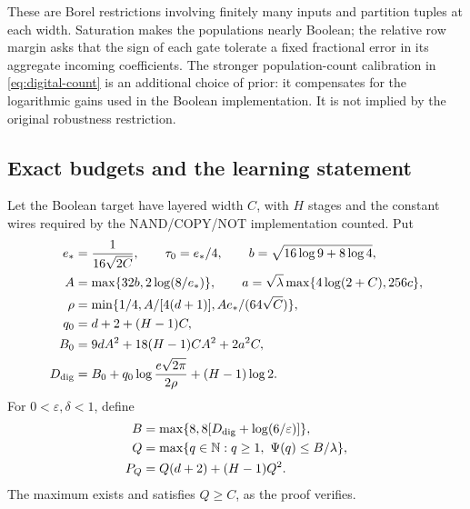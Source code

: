 These are Borel restrictions involving finitely many inputs and partition
tuples at each width.  Saturation makes the populations nearly Boolean;
the relative row margin asks that the sign of each gate tolerate a fixed
fractional error in its aggregate incoming coefficients.  The stronger
population-count calibration in \eqref{eq:digital-count} is an additional
choice of prior: it compensates for the logarithmic gains used in the
Boolean implementation.  It is not implied by the original robustness
restriction.

\subsection{Exact budgets and the learning statement}

Let the Boolean target have layered width $C$, with $H$ stages and the
constant wires required by the NAND/COPY/NOT implementation counted.
Put
\begin{align}
 e_*&=\frac1{16\sqrt{2C}},\qquad \tau_0=e_*/4,\qquad
 b=\sqrt{16\log9+8\log4},\notag\\
 A&=\max\{32b,2\log(8/e_*)\},\qquad
 a=\sqrt\lambda\max\{4\log(2+C),256c\},\notag\\
 \rho&=\min\{1/4,A/[4(d+1)],Ae_*/(64\sqrt C)\},\notag\\
 q_0&=d+2+(H-1)C,\notag\\
 B_0&=9dA^2+18(H-1)CA^2+2a^2C,\notag\\
 D_{\rm dig}&=B_0+q_0\log\frac{e\sqrt{2\pi}}{2\rho}+(H-1)\log2.
 \label{eq:digital-target-budget}
\end{align}
For $0<\varepsilon,\delta<1$, define
\begin{equation}\label{eq:digital-stat-budget}
 \begin{aligned}
 B&=\max\{8,8[D_{\rm dig}+\log(6/\varepsilon)]\},\\
 Q&=\max\{q\in\mathbb N:q\ge1,\ \Psi(q)\le B/\lambda\},\\
 P_Q&=Q(d+2)+(H-1)Q^2.
 \end{aligned}
\end{equation}
The maximum exists and satisfies $Q\ge C$, as the proof verifies.

